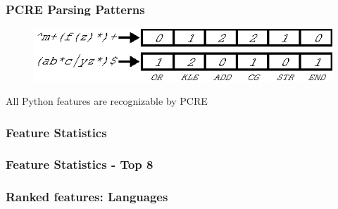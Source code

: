 



\begin{frame}
\frametitle{PCRE Parsing Patterns}
\begin{figure}[h]
  \centering
  \includegraphics[scale=1]{nontex/illustrations/featureParsing.eps}
  \label{fig:featureParsing}
\end{figure}
\begin{center}
\begin{Large}
All Python features are recognizable by PCRE
\end{Large}
\end{center}
\end{frame}


\begin{frame}[fragile]
\frametitle{Feature Statistics}

\end{frame}


\begin{frame}[fragile]
\frametitle{Feature Statistics - Top 8}

\end{frame}




\begin{frame}[fragile]
\frametitle{Ranked features: Languages}

\end{frame}

